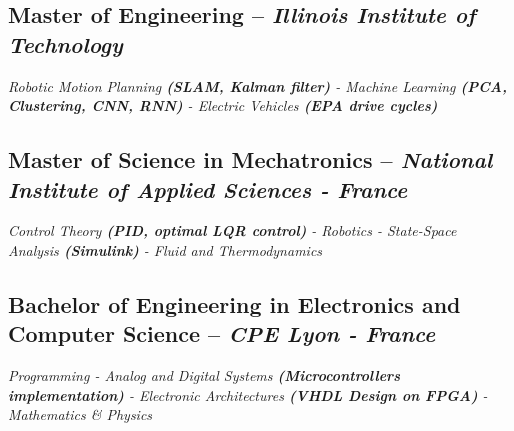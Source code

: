 \documentclass[]{article}
\begin{document}
\normalsize
\subsection{Master of Engineering -- \textit{Illinois Institute of Technology}}

\small{
\textit{Robotic Motion Planning \textbf{(SLAM, Kalman filter)} - Machine Learning \textbf{(PCA, Clustering, CNN, RNN)} - Electric Vehicles \textbf{(EPA drive cycles)} }
}

\normalsize
\subsection{Master of Science in Mechatronics -- \textit{National Institute of Applied Sciences - France}}

\small{
\textit{Control Theory \textbf{(PID, optimal LQR control)} - Robotics - State-Space Analysis \textbf{(Simulink)} - Fluid and Thermodynamics} 
}%

\normalsize
\subsection{Bachelor of Engineering in Electronics and Computer Science -- \textit{CPE Lyon - France}}

\small{
\textit{Programming - Analog and Digital Systems \textbf{(Microcontrollers implementation)} - Electronic Architectures \textbf{(VHDL Design on FPGA)} - Mathematics \& Physics}
}
\end{document}
